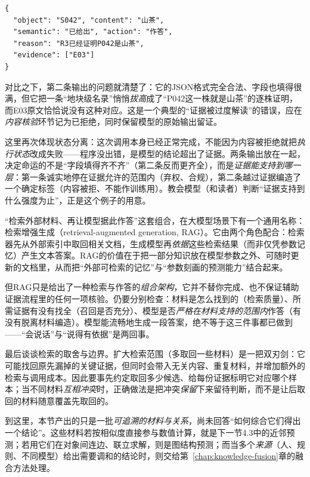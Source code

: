 \begin{lstlisting}[style=book code,numbers=none]
{
  "object": "S042", "content": "山茶",
  "semantic": "已给出", "action": "作答",
  "reason": "R3已经证明P042是山茶",
  "evidence": ["E03"]
}
\end{lstlisting}

对比之下，第二条输出的问题就清楚了：它的JSON格式完全合法、字段也填得很满，但它把一条“地块级名录”悄悄\emph{拔高}成了“P042这一株就是山茶”的逐株证明，而E03原文恰恰说没有这种对应。这是一个典型的“证据被过度解读”的错误，应在\emph{内容核验}环节记为已拒绝，同时保留模型的原始输出留证。

这里再次体现状态分离：这次调用本身已经正常完成，不能因为内容被拒绝就把\emph{执行状态}改成失败——程序没出错，是模型的结论超出了证据。两条输出放在一起，决定命运的不是“字段填得齐不齐”（第二条反而更齐全），而是\emph{证据能支持到哪一层}：第一条诚实地停在证据允许的范围内（弃权、合规），第二条越过证据编造了一个确定标签（内容被拒、不能作训练用）。教会模型（和读者）判断“证据支持到什么强度为止”，正是这个例子的用意。

“检索外部材料、再让模型据此作答”这套组合，在大模型场景下有一个通用名称：检索增强生成（retrieval-augmented generation, RAG）。它由两个角色配合：检索器先从外部索引中取回相关文档，生成模型再\emph{依据}这些检索结果（而非仅凭参数记忆）产生文本答案。RAG的价值在于把一部分知识放在模型参数之外、可随时更新的文档里，从而把“外部可检索的记忆”与“参数刻画的预测能力”结合起来。

但RAG只是给出了一种检索与作答的\emph{组合架构}，它并不替你完成、也不保证辅助证据流程里的任何一项核验。仍要分别检查：材料是怎么找到的（检索质量）、所需证据有没有找全（召回是否充分）、模型是否\emph{严格在材料支持的范围内}作答（有没有脱离材料编造）。模型能流畅地生成一段答案，绝不等于这三件事都已做到——“会说话”与“说得有依据”是两回事。

最后谈谈检索的取舍与边界。扩大检索范围（多取回一些材料）是一把双刃剑：它可能找回原先漏掉的关键证据，但同时会带入无关内容、重复材料，并增加额外的检索与调用成本。因此要事先约定取回多少候选、给每份证据标明它对应哪个样本；当不同材料\emph{互相冲突}时，正确做法是把冲突\emph{保留}下来留待判断，而不是让后取回的材料随意覆盖先取回的。

到这里，本节产出的只是一批\emph{可追溯的材料与关系}，尚未回答“如何综合它们得出一个结论”。这些材料若按相似度直接参与数值计算，就是下一节4.3中的近邻预测；若用它们在对象间连边、联立求解，则是图结构预测；而当多个\emph{来源}（人、规则、不同模型）给出需要调和的结论时，则交给第~\ref{chap:knowledge-fusion}章的融合方法处理。

